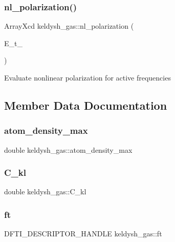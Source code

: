 \subsubsection{\texorpdfstring{nl\+\_\+polarization()}{nl\_polarization()}}
{\footnotesize\ttfamily Array\+Xcd keldysh\+\_\+gas\+::nl\+\_\+polarization (\begin{DoxyParamCaption}\item[{Array\+Xd}]{E\+\_\+t\+\_\+ }\end{DoxyParamCaption})}

Evaluate nonlinear polarization for active frequencies 

\subsection{Member Data Documentation}
\mbox{\label{classkeldysh__gas_a287e2c7a3081d8b65ba126288a3174bd}} 
\subsubsection{\texorpdfstring{atom\+\_\+density\+\_\+max}{atom\_density\_max}}
{\footnotesize\ttfamily double keldysh\+\_\+gas\+::atom\+\_\+density\+\_\+max}

\mbox{\label{classkeldysh__gas_a7a66e438ff78b240fe419c0a426b1648}} 
\subsubsection{\texorpdfstring{C\+\_\+kl}{C\_kl}}
{\footnotesize\ttfamily double keldysh\+\_\+gas\+::\+C\+\_\+kl}

\mbox{\label{classkeldysh__gas_ac635d55dcbdfcde7c34d77de5cd75af6}} 
\subsubsection{\texorpdfstring{ft}{ft}}
{\footnotesize\ttfamily D\+F\+T\+I\+\_\+\+D\+E\+S\+C\+R\+I\+P\+T\+O\+R\+\_\+\+H\+A\+N\+D\+LE keldysh\+\_\+gas\+::ft\hspace{0.3cm}{\ttfamily [private]}}

